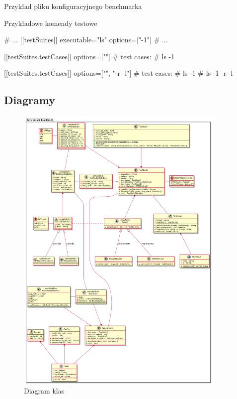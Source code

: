 \documentclass[a4paper,12pt]{article}
\newenvironment{longlisting}{\captionsetup{type=listing}}{}
\begin{document}
\begin{longlisting}
  \caption{Przykład pliku konfiguracyjnego benchmarka}
  \label{configFile}
\end{longlisting}


\begin{longlisting}
  \caption{Przykładowe komendy testowe}
  \begin{tomlcode}
# ...
[[testSuites]]
executable="ls"
options=["-1"]
# ...

[[testSuites.testCases]]
options=[""]
# test cases:
# ls -1

[[testSuites.testCases]]
options=["", "-r -l"]
# test cases:
# ls -1
# ls -1 -r -l
  \end{tomlcode}
\end{longlisting}

\subsection{Diagramy}

\begin{figure}[H]
  \centering
  \includegraphics[width=0.9\textwidth]{benchmark/class_diagram.png}
  \caption{Diagram klas}
\end{figure}
\end{document}
